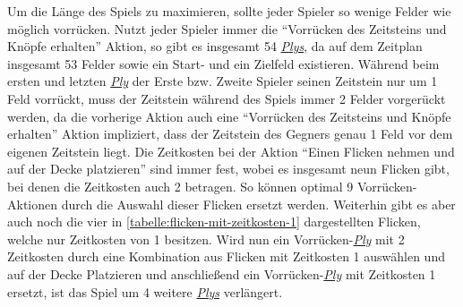Um die Länge des Spiels zu maximieren, sollte jeder Spieler so wenige Felder wie möglich vorrücken. Nutzt jeder Spieler immer die \enquote{Vorrücken des Zeitsteins und Knöpfe erhalten} Aktion, so gibt es insgesamt 54 \hyperref[text:ply]{\emph{Plys}}, da auf dem Zeitplan insgesamt 53 Felder sowie ein Start- und ein Zielfeld existieren. Während beim ersten und letzten \hyperref[text:ply]{\emph{Ply}} der Erste bzw. Zweite Spieler seinen Zeitstein nur um 1 Feld vorrückt, muss der Zeitstein während des Spiels immer 2 Felder vorgerückt werden, da die vorherige Aktion \textemdash{} auch eine \enquote{Vorrücken des Zeitsteins und Knöpfe erhalten} Aktion \textemdash{} impliziert, dass der Zeitstein des Gegners genau 1 Feld vor dem eigenen Zeitstein liegt. Die Zeitkosten bei der Aktion \enquote{Einen Flicken nehmen und auf der Decke platzieren} sind immer fest, wobei es insgesamt neun Flicken gibt, bei denen die Zeitkosten auch 2 betragen. So können optimal 9 Vorrücken-Aktionen durch die Auswahl dieser Flicken ersetzt werden. Weiterhin gibt es aber auch noch die vier in \ref{tabelle:flicken-mit-zeitkosten-1} dargestellten Flicken, welche nur Zeitkosten von 1 besitzen. Wird nun ein Vorrücken-\hyperref[text:ply]{\emph{Ply}} mit 2 Zeitkosten durch eine Kombination aus Flicken mit Zeitkosten 1 auswählen und auf der Decke Platzieren und anschließend ein Vorrücken-\hyperref[text:ply]{\emph{Ply}} mit Zeitkosten 1 ersetzt, ist das Spiel um 4 weitere \hyperref[text:ply]{\emph{Plys}} verlängert.

